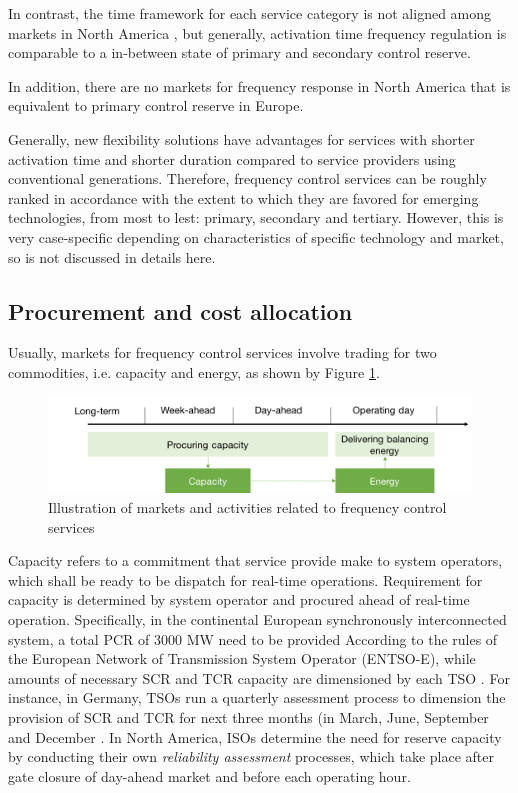 In contrast, the time framework for each service category is not aligned among markets in North America \cite{EllisonJ.F.TesfatsionL.S.LooseV.W.Byrne2012}, but generally, activation time frequency regulation is comparable to a in-between state of primary and secondary control reserve. 

In addition, there are no markets for frequency response in North America \cite{EllisonJ.F.TesfatsionL.S.LooseV.W.Byrne2012} that is equivalent to primary control reserve in Europe.

Generally, new flexibility solutions have advantages for services with shorter activation time and shorter duration compared to service providers using conventional generations. Therefore, frequency control services can be roughly ranked in accordance with the extent to which they are favored for emerging technologies, from most to lest: primary, secondary and tertiary. However, this is very case-specific depending on characteristics of specific technology and market, so is not discussed in details here.

\subsection{Procurement and cost allocation}

Usually, markets for frequency control services involve trading for two commodities, i.e. capacity and energy, as shown by Figure \ref{fig:FCR_market}. 

\begin{figure}[h!]
	\centering
	\includegraphics[width=0.95\linewidth]{Figures/FCR_market}
	\caption{Illustration of markets and activities related to frequency control services}
	\label{fig:FCR_market}
\end{figure}

Capacity refers to a commitment that service provide make to system operators, which shall be ready to be dispatch for real-time operations.  Requirement for capacity is determined by system operator and procured ahead of real-time operation. Specifically, in the continental European synchronously interconnected system, a total PCR of 3000 MW need to be provided According to the rules of the European Network of Transmission System Operator (ENTSO-E), while amounts of necessary SCR and TCR capacity are dimensioned by each TSO \cite{ENTSO-e_handbook}. For instance, in Germany, TSOs run a quarterly assessment process to dimension the provision of SCR and TCR for next three months (in March, June, September and December \cite{ConsentecGmbH2014}. In North America, ISOs determine the need for reserve capacity by conducting their own \textit{reliability assessment} processes, which take place after gate closure of day-ahead market and before each operating hour\cite{EllisonJ.F.TesfatsionL.S.LooseV.W.Byrne2012}. 

